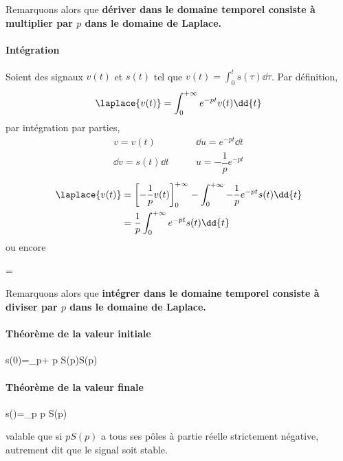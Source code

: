 Remarquons alors que \textbf{dériver dans le domaine temporel consiste à multiplier par 
$p$ dans le domaine de Laplace.}
\paragraph{Intégration}
Soient  des signaux $v(t)$ et $s(t)$ tel que $v(t)=\int_{0}^{t}s(\tau)\dd{\tau}$. 
Par définition,
$$
\laplace{v(t)}=\int_{0}^{+\infty} e^{-pt}v(t)\dd{t}
$$
par intégration par parties,
\begin{align*}
    v=v(t)\qquad&\dd{u}=e^{-pt}\dd{t}\\
    \dd{v}=s(t)\dd{t}\qquad&u=-\dfrac{1}{p}e^{-pt}
\end{align*} 
\begin{align*}
    \laplace{v(t)}&=\left[-\dfrac{1}{p}v(t)\right]_0^{+\infty}-\int_{0}^{+\infty} -\dfrac{1}{p}e^{-pt}s(t)\dd{t} \\
    &=\dfrac{1}{p}\int_{0}^{+\infty} e^{-pt}s(t)\dd{t}       
\end{align*}
ou encore
\begin{bequation}
    =
\end{bequation}
Remarquons alors que \textbf{intégrer dans le domaine temporel consiste à diviser par $p$ 
dans le domaine de Laplace.}


\paragraph{Théorème de la valeur initiale}
\begin{bequation}
    s(0)=\lim\limits_{p\rightarrow+\infty} p S(p)\qquad \forall S(p)
\end{bequation}

\paragraph{Théorème de la valeur finale}
\begin{bequation}
    s(\infty)=\lim\limits_{p} p S(p)
\end{bequation}
valable que si $pS(p)$ a tous ses pôles à partie réelle strictement négative, autrement dit que le
signal soit stable.



